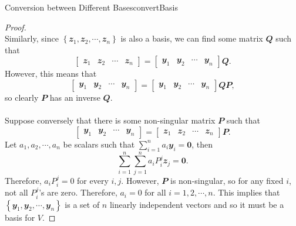 \documentclass[math]{amznotes}
\theoremstyle{remark}
\newcommand{\zero}{\mathbf{0}}
\begin{document}
\begin{probox}{Conversion between Different Bases}{convertBasis}
\begin{proof}
\begin{equation*}
        \end{equation*}
        Similarly, since $\left\{\mathbfit{z}_1, \mathbfit{z}_2, \cdots, \mathbfit{z}_n\right\}$ is also a basis, we can find some matrix $\mathbfit{Q}$ such that 
        \begin{equation*}
            \begin{bmatrix}
                \mathbfit{z}_1 & \mathbfit{z}_2 & \cdots & \mathbfit{z}_n
            \end{bmatrix} = \begin{bmatrix}
                \mathbfit{y}_1 & \mathbfit{y}_2 & \cdots & \mathbfit{y}_n
            \end{bmatrix}\mathbfit{Q}.
        \end{equation*}
        However, this means that 
        \begin{equation*}
            \begin{bmatrix}
                \mathbfit{y}_1 & \mathbfit{y}_2 & \cdots & \mathbfit{y}_n
            \end{bmatrix} = \begin{bmatrix}
                \mathbfit{y}_1 & \mathbfit{y}_2 & \cdots & \mathbfit{y}_n
            \end{bmatrix}\mathbfit{QP},
        \end{equation*}
        so clearly $\mathbfit{P}$ has an inverse $\mathbfit{Q}$.
        \\\\
        Suppose conversely that there is some non-singular matrix $\mathbfit{P}$ such that 
        \begin{equation*}
            \begin{bmatrix}
                \mathbfit{y}_1 & \mathbfit{y}_2 & \cdots & \mathbfit{y}_n
            \end{bmatrix} = \begin{bmatrix}
                \mathbfit{z}_1 & \mathbfit{z}_2 & \cdots & \mathbfit{z}_n
            \end{bmatrix}\mathbfit{P}.
        \end{equation*}
        Let $a_1, a_2, \cdots, a_n$ be scalars such that $\sum_{i = 1}^{n}a_i\mathbfit{y}_i = \zero$, then 
        \begin{equation*}
            \sum_{i = 1}^{n}\sum_{j = 1}^{n}a_iP^j_i\mathbfit{z}_j = \zero.
        \end{equation*}
        Therefore, $a_iP^j_i = 0$ for every $i, j$. However, $\mathbfit{P}$ is non-singular, so for any fixed $i$, not all $P^j_i$'s are zero. Therefore, $a_i = 0$ for all $i = 1, 2, \cdots, n$. This implies that $\left\{\mathbfit{y}_1, \mathbfit{y}_2, \cdots, \mathbfit{y}_n\right\}$ is a set of $n$ linearly independent vectors and so it must be a basis for $V$.
    \end{proof}
\end{probox}
\end{document}

